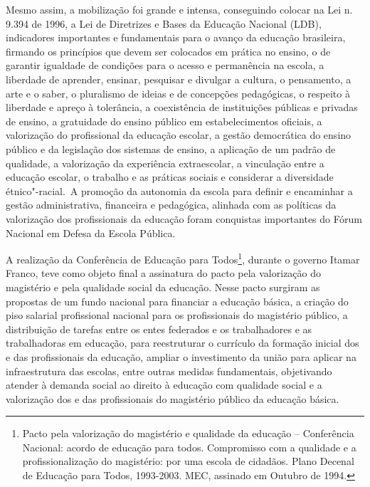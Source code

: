 Mesmo assim, a mobilização foi grande e intensa, conseguindo colocar na
Lei n. 9.394 de 1996, a Lei de Diretrizes e Bases da Educação Nacional
(LDB), indicadores importantes e fundamentais para o avanço da educação
brasileira, firmando os princípios que devem ser colocados em prática no
ensino, o de garantir igualdade de
condições para o acesso e permanência na escola,
a liberdade de aprender, ensinar,
pesquisar e divulgar a cultura, o pensamento, a arte e o saber,
o pluralismo de ideias e de concepções
pedagógicas, o respeito à liberdade e
apreço à tolerância, a coexistência de
instituições públicas e privadas de
ensino, a gratuidade do ensino público
em estabelecimentos oficiais, a
valorização do profissional da educação
escolar, a gestão democrática do
ensino público e da legislação dos sistemas de ensino,
a aplicação de um padrão de qualidade,
a valorização da experiência
extraescolar, a vinculação entre a
educação escolar, o trabalho e as práticas sociais
e considerar a diversidade
étnico"-racial.~A promoção da autonomia da escola para definir e
encaminhar a gestão administrativa, financeira e pedagógica, alinhada
com as políticas da valorização dos profissionais da educação foram
conquistas importantes do Fórum Nacional em Defesa da Escola
Pública.

A realização da Conferência de Educação para Todos\footnote{Pacto pela
  valorização do magistério e qualidade da educação -- Conferência
  Nacional: acordo de educação para todos. Compromisso com a qualidade e
  a profissionalização do magistério: por uma escola de cidadãos. Plano
  Decenal de Educação para Todos, 1993-2003. MEC, assinado em Outubro de
  1994.}, durante o governo Itamar Franco, teve como objeto final a
assinatura do pacto pela valorização do magistério e pela qualidade
social da educação. Nesse pacto surgiram as propostas de um fundo
nacional para financiar a educação básica, a criação do piso salarial
profissional nacional para os profissionais do magistério público, a
distribuição de tarefas entre os entes federados e os trabalhadores e as
trabalhadoras em educação, para reestruturar o currículo da formação
inicial dos e das profissionais da educação, ampliar o investimento da
união para aplicar na infraestrutura das escolas, entre outras medidas
fundamentais, objetivando atender à demanda social ao direito à educação
com qualidade social e a valorização dos e das profissionais do
magistério público da educação básica.

